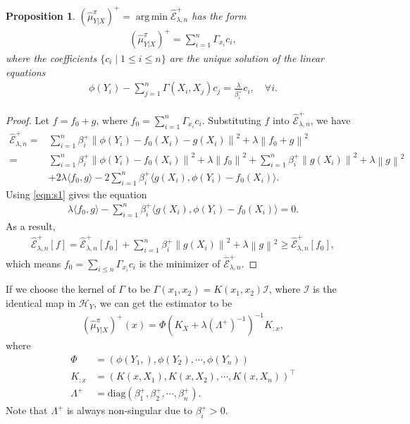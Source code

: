 \documentclass[a4paper]{article}
\newcommand{\up}{\mathrm}
\renewcommand{\cal}{\mathcal}
\newcommand{\norm}[1]{\left\lVert#1\right\rVert}
\newcommand{\T}{\intercal}
\DeclareMathOperator*{\argmin}{arg\,min}
\newtheorem{proposition}{Proposition}
\def\eplus{\widehat{\cal{E}}_{\lambda,n}^+}
\def\muyxplus{(\widehat{\mu}_{Y|X}^\pi)^+}
\begin{document}
\begin{proposition}\label{prop:bayes+}
$\muyxplus = \argmin \eplus$ has the form
\begin{align}
\muyxplus = \sum_{i=1}^n \Gamma_{x_i}c_i,
\end{align}
where the coefficients $\{c_i\mid 1\leq i\leq n\}$ are the unique solution of the linear equations
\begin{align}
\phi(Y_i) - \sum_{j=1}^n \Gamma(X_i,X_j)c_j = \frac{\lambda}{\beta_i^+} c_i,\quad \forall i.\label{eqn:s1}
\end{align}
\end{proposition}
\begin{proof}
Let $f = f_0 +g$, where $f_0 = \sum_{i=1}^n \Gamma_{x_i}c_i$. Substituting $f$ into $\eplus$, we have
\begin{align}
\eplus =& \sum_{i=1}^n \beta_i^+ \norm{\phi(Y_i) - f_0(X_i) - g(X_i)}^2 + \lambda \norm{f_0+g}^2\\
=& \sum_{i=1}^n\beta_i^+ \norm{\phi(Y_i)-f_0(X_i)}^2 + \lambda\norm{f_0}^2 + \sum_{i=1}^n \beta_i^+ \norm{g(X_i)}^2 + \lambda \norm{g}^2\\
 &+ 2\lambda\langle f_0,g\rangle - 2\sum_{i=1}^n \beta_i^+ \langle g(X_i) ,\phi(Y_i) - f_0(X_i)\rangle.
\end{align}
Using \eqref{eqn:s1} gives the equation
\begin{align}
\lambda\langle f_0,g\rangle - \sum_{i=1}^n \beta_i^+ \langle g(X_i) ,\phi(Y_i) - f_0(X_i)\rangle = 0.
\end{align}
As a result,
\begin{align}
\eplus[f] = \eplus[f_0] + \sum_{i=1}^n \beta_i^+ \norm{g(X_i)}^2 + \lambda \norm{g}^2 \geq \eplus[f_0],
\end{align}
which means $f_0=\sum_{i\leq n}\Gamma_{x_i}c_i$ is the minimizer of $\eplus$.
\end{proof}
If we choose the kernel of $\Gamma$ to be $\Gamma(x_1,x_2) = K(x_1,x_2)\cal{I}$, where $\cal{I}$ is the identical map in $\cal{H}_Y$, we can get the estimator to be
\begin{align}
\boxed{\muyxplus(x) = \Phi(K_X + \lambda(\Lambda^+)^{-1})^{-1}K_{:x}}\label{eqn:bayes},
\end{align}
where
\begin{align*}
\Phi &= (\phi(Y_1,),\phi(Y_2),\cdots,\phi(Y_n))\\
K_{:x} &= (K(x,X_1),K(x,X_2),\cdots,K(x,X_n))^\T\\
\Lambda^+ &= \up{diag}(\beta_1^+,\beta_2^+,\cdots,\beta_n^+).
\end{align*}
Note that $\Lambda^+$ is always non-singular due to $\beta_i^+ > 0$.
\end{document}
